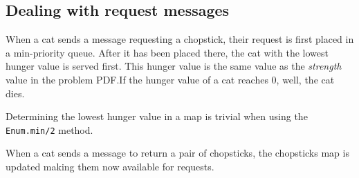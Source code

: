 

\subsection{Dealing with request messages}
When a cat sends a message requesting a chopstick, their request is first placed in a min-priority queue. After it has been placed there, the cat with the lowest hunger value is served first. This hunger value is the same value as the \textit{strength} value in the problem PDF.If the hunger value of a cat reaches 0, well, the cat dies.



Determining the lowest hunger value in a map is trivial when using the \texttt{Enum.min/2} method.

When a cat sends a message to return a pair of chopsticks, the chopsticks map is updated making them now available for requests.